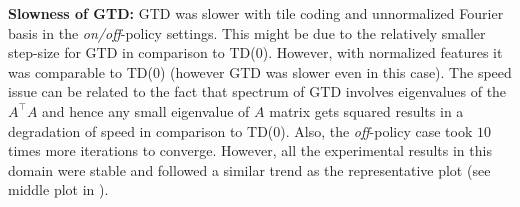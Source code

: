  \textbf{Slowness of GTD:}  GTD was slower with tile coding and unnormalized Fourier basis in the \emph{on/off}-policy settings. This might be due to the relatively smaller step-size for GTD in comparison to TD(0). However, with normalized features it was comparable to TD(0) (however GTD was slower even in this case). The speed issue can be related to the fact that spectrum of GTD involves eigenvalues of the $A^\top A$  and hence any small eigenvalue of $A$ matrix gets squared results in a degradation of speed in comparison to TD(0). Also, the \emph{off}-policy case took $10$ times more iterations to converge. However, all the experimental results in this domain were stable and followed a similar trend as the representative plot (see middle plot in ).
\begin{table}
\caption{step-size choices for the \emph{on/off}-policy settings in the mountain car experiment. The same step-size rule was followed for TD as well as GTD. Notice that these step-size choices directly follow from the results in  without any further tuning.}
\label{tab:step-size}
\end{table}
%


